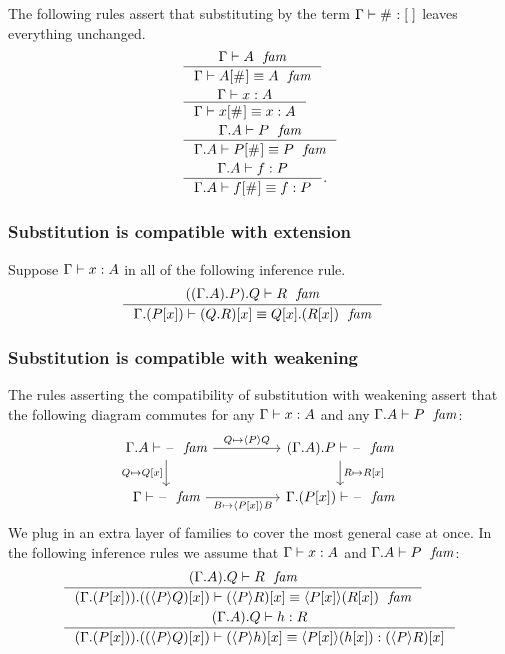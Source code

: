 The following rules assert that substituting by the term $\jterm{\Gamma}{\emptyf}{\emptytm}$
leaves everything unchanged.
\begin{align}
& \inference{\jfam{\Gamma}{A}}{\jfameq{\Gamma}{\subst{\emptytm}{A}}{A}}\\
& \inference{\jterm{\Gamma}{A}{x}}{\jtermeq{\Gamma}{A}{\subst{\emptytm}{x}}{x}}\\
& \inference{\jfam{{\Gamma}{A}}{P}}{\jfameq{{\Gamma}{A}}{\subst{\emptytm}{P}}{P}}\\
& \inference{\jterm{{\Gamma}{A}}{P}{f}}{\jtermeq{{\Gamma}{A}}{P}{\subst{\emptytm}{f}}{f}}.
\end{align}

\subsubsection{Substitution is compatible with extension}\label{comp-se}
Suppose $\jterm{\Gamma}{A}{x}$ in all of the following inference rule.
\begin{align}
& \inference{\jfam{{{{\Gamma}{A}}{P}}{Q}}{R}}
  {\jfameq{{\Gamma}{\subst{x}{P}}}{\subst{x}{\ctxext{Q}{R}}}{\ctxext{\subst{x}{Q}}{\subst{x}{R}}}}
\end{align}

\subsubsection{Substitution is compatible with weakening}\label{comp-sw}
The rules asserting the compatibility of substitution with weakening assert
that the following diagram commutes for any $\jterm{\Gamma}{A}{x}$ and any
$\jfam{{\Gamma}{A}}{P}$:
\begin{equation*}
\begin{tikzcd}[column sep=huge]
\jfam{{\Gamma}{A}}{\blank} \ar{d}[swap]{Q\mapsto\subst{x}{Q}} \ar{r}{Q\mapsto\ctxwk{P}{Q}} & \jfam{{{\Gamma}{A}}{P}}{\blank} \ar{d}{R\mapsto\subst{x}{R}}\\ 
\jfam{\Gamma}{\blank} \ar{r}[swap]{B\mapsto\ctxwk{\subst{x}{P}}{B}} & \jfam{{\Gamma}{\subst{x}{P}}}{\blank}
\end{tikzcd}
\end{equation*}
We plug in an extra layer of families to cover the most general case at once.
In the following inference rules we assume that $\jterm{\Gamma}{A}{x}$ and
$\jfam{{\Gamma}{A}}{P}$:
\begin{align}
& \inference
  {\jfam{{{\Gamma}{A}}{Q}}{R}}
  {\jfameq{{{\Gamma}{\subst{x}{P}}}{\subst{x}{\ctxwk{P}{Q}}}}{\subst{x}{\ctxwk{P}{R}}}{\ctxwk{\subst{x}{P}}{\subst{x}{R}}}}\label{comp-sw-f}\\
& \inference
    {\jterm{{{\Gamma}{A}}{Q}}{R}{h}}
    {\jtermeq
      {\ctxext{{\Gamma}{\subst{x}{P}}}{\subst{x}{\ctxwk{P}{Q}}}}
      {\subst{x}{\ctxwk{P}{R}}}
      {\subst{x}{\ctxwk{P}{h}}}
      {\ctxwk{\subst{x}{P}}{\subst{x}{h}}}}\label{comp-sw-t}
\end{align}

